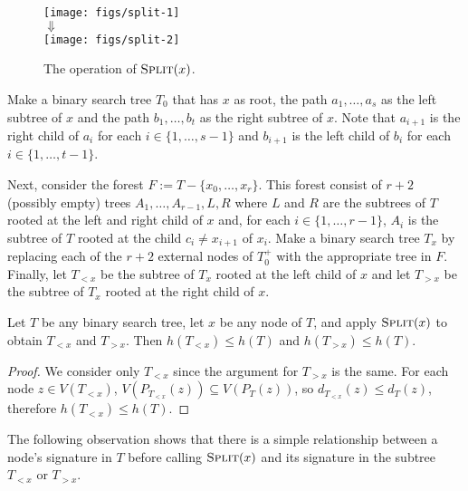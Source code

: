 \documentclass[kpfonts]{patmorin}
\let\le\leqslant
\begin{document}
\begin{figure}
  \begin{center}
    \texttt{[image: figs/split-1]} \\[1ex]
    $\Downarrow$ \\[1ex]
    \texttt{[image: figs/split-2]}
  \end{center}
  \caption{The operation of $\textsc{Split}(x)$.}
\end{figure}

Make a binary search tree $T_0$ that has $x$ as root, the path $a_1,\ldots,a_s$ as the left subtree of $x$ and the path $b_1,\ldots,b_t$ as the right subtree of $x$.  Note that $a_{i+1}$ is the right child of $a_i$ for each $i\in\{1,\ldots,s-1\}$ and $b_{i+1}$ is the left child of $b_i$ for each $i\in\{1,\ldots,t-1\}$. 

Next, consider the forest $F:=T-\{x_0,\ldots,x_r\}$. This forest consist of $r+2$ (possibly empty) trees $A_1,\ldots,A_{r-1},L,R$ where $L$ and $R$ are the subtrees of $T$ rooted at the left and right child of $x$ and, for each $i\in\{1,\ldots,r-1\}$, $A_i$ is the subtree of $T$ rooted at the child $c_i\neq x_{i+1}$ of $x_i$.  Make a binary search tree $T_x$ by replacing each of the $r+2$ external nodes of $T_0^+$ with the appropriate tree in $F$.  Finally, let $T_{<x}$ be the subtree of $T_x$ rooted at the left child of $x$ and let $T_{>x}$ be the subtree of $T_x$ rooted at the right child of $x$.

\begin{lem}
  Let $T$ be any binary search tree, let $x$ be any node of $T$, and apply $\textsc{Split}(x)$ to obtain $T_{<x}$ and $T_{>x}$.  
  Then $h(T_{<x})\le h(T)$ and $h(T_{>x})\le h(T)$.
\end{lem}

\begin{proof}
  We consider only $T_{<x}$ since the argument for $T_{>x}$ is the same.
  For each node $z\in V(T_{<x})$, $V(P_{T_{<x}}(z))\subseteq V(P_T(z))$, so $d_{T_{<x}}(z)\le d_T(z)$, therefore $h(T_{<x})\le h(T)$.
\end{proof}

The following observation shows that there is a simple relationship between a node's signature in $T$ before calling $\textsc{Split}(x)$ and its signature in the subtree $T_{<x}$ or $T_{>x}$.
\end{document}
